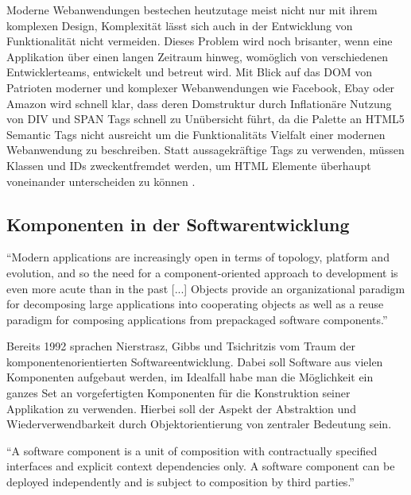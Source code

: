 Moderne Webanwendungen bestechen heutzutage meist nicht nur mit ihrem komplexen Design, Komplexität lässt sich auch in der Entwicklung
von Funktionalität nicht vermeiden. Dieses Problem wird noch brisanter, wenn eine Applikation über einen langen Zeitraum hinweg,
womöglich von verschiedenen Entwicklerteams, entwickelt und betreut wird. Mit Blick auf das \ac{DOM} von Patrioten moderner und komplexer Webanwendungen wie Facebook, Ebay oder Amazon
wird schnell klar, dass deren Domstruktur durch Inflationäre Nutzung von DIV und SPAN Tags schnell zu Unübersicht führt,
da die Palette an HTML5 Semantic Tags nicht ausreicht um die Funktionalitäts Vielfalt einer modernen Webanwendung zu beschreiben.
Statt aussagekräftige Tags zu verwenden, müssen Klassen und IDs zweckentfremdet werden, um HTML Elemente überhaupt voneinander unterscheiden zu können
\cite{sitepoint-introduction-to-webcomponents}.

\subsection{Komponenten in der Softwarentwicklung}

``Modern applications are increasingly
open in terms of topology,
platform and evolution, and so the
need for a component-oriented
approach to development is even
more acute than in the past [...]  Objects provide an organizational
paradigm for decomposing large
applications into cooperating objects
as well as a reuse paradigm for
composing applications from prepackaged
software components.''
\cite{nierstrasz1992component}

\vspace{0.5cm}

Bereits 1992 sprachen Nierstrasz, Gibbs und Tsichritzis vom Traum der komponentenorientierten Softwareentwicklung.
Dabei soll Software aus vielen Komponenten aufgebaut werden, im Idealfall habe man die Möglichkeit ein
ganzes Set an vorgefertigten Komponenten für die Konstruktion seiner Applikation zu verwenden.
Hierbei soll der Aspekt der Abstraktion und Wiederverwendbarkeit durch Objektorientierung von zentraler Bedeutung sein.

\vspace{0.5cm}
``A software component is a unit of composition with contractually specified interfaces and explicit
context dependencies only. A software component can be deployed independently and is subject to composition
by third parties.''
\cite{Szyperski}
\vspace{0.5cm}

